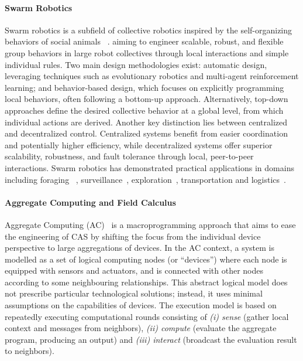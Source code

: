 \documentclass[12pt]{article}
\begin{document}
\paragraph{\textbf{Swarm Robotics}} Swarm robotics is a subfield of collective robotics inspired by the self-organizing behaviors of social animals  ~\cite{brambilla2013swarm}. aiming to engineer scalable, robust, and flexible group behaviors in large robot collectives through local interactions and simple individual rules. Two main design methodologies exist: automatic design, leveraging techniques such as evolutionary robotics and multi-agent reinforcement learning; and behavior-based design, which focuses on explicitly programming local behaviors, often following a bottom-up approach. Alternatively, top-down approaches define the desired collective behavior at a global level, from which individual actions are derived. Another key distinction lies between centralized and decentralized control. Centralized systems benefit from easier coordination and potentially higher efficiency, while decentralized systems offer superior scalability, robustness, and fault tolerance through local, peer-to-peer interactions. Swarm robotics has demonstrated practical applications in domains including foraging
~\cite{talamali2020sophisticated}, surveillance~\cite{saska2016swarm}, exploration~\cite{huang2019exploration}, transportation and logistics~\cite{zhang2015swarm}.

\paragraph{\textbf{Aggregate Computing and Field Calculus}} Aggregate Computing (AC)~\cite{beal2016aggregate} is a macroprogramming approach that aims to ease the engineering of CAS by shifting the
focus from the individual device perspective to large aggregations of devices.
In the AC context, a system  is modelled as a set of logical computing nodes (or ``devices'')
where each node is equipped with sensors and actuators, and is connected with other nodes
according to some neighbouring relationships. This abstract logical model does not prescribe
particular technological solutions; instead, it uses minimal assumptions on the capabilities
of devices. The execution model is based on repeatedly executing computational rounds consisting of
\textit{(i) sense} (gather local context and messages from neighbors), \textit{(ii) compute} (evaluate the aggregate program, producing an output) and 
\textit{(iii) interact} (broadcast the evaluation result to neighbors).
\end{document}
